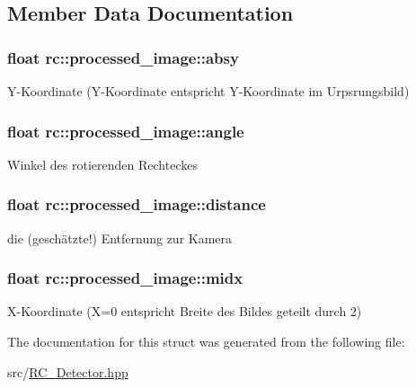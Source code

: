 \subsection{Member Data Documentation}
\hypertarget{structrc_1_1processed__image_a3885be6e15744069afb4b429777497fa}{
\subsubsection[{absy}]{\setlength{\rightskip}{0pt plus 5cm}float rc\+::processed\+\_\+image\+::absy}}\label{structrc_1_1processed__image_a3885be6e15744069afb4b429777497fa}
Y-\/\+Koordinate (Y-\/\+Koordinate entspricht Y-\/\+Koordinate im Urpsrungsbild) \hypertarget{structrc_1_1processed__image_ac17fea85630583e2cf1de55b89334e4f}{
\subsubsection[{angle}]{\setlength{\rightskip}{0pt plus 5cm}float rc\+::processed\+\_\+image\+::angle}}\label{structrc_1_1processed__image_ac17fea85630583e2cf1de55b89334e4f}
Winkel des rotierenden Rechteckes \hypertarget{structrc_1_1processed__image_a6f90b2318450001568fcc112e294f8df}{
\subsubsection[{distance}]{\setlength{\rightskip}{0pt plus 5cm}float rc\+::processed\+\_\+image\+::distance}}\label{structrc_1_1processed__image_a6f90b2318450001568fcc112e294f8df}
die (geschätzte!) Entfernung zur Kamera \hypertarget{structrc_1_1processed__image_a0213f6e61795e2dbcaa500885554dbde}{
\subsubsection[{midx}]{\setlength{\rightskip}{0pt plus 5cm}float rc\+::processed\+\_\+image\+::midx}}\label{structrc_1_1processed__image_a0213f6e61795e2dbcaa500885554dbde}
X-\/\+Koordinate (X=0 entspricht Breite des Bildes geteilt durch 2) 

The documentation for this struct was generated from the following file\+:\begin{DoxyCompactItemize}
\item 
src/\hyperlink{RC__Detector_8hpp}{R\+C\+\_\+\+Detector.\+hpp}\end{DoxyCompactItemize}
